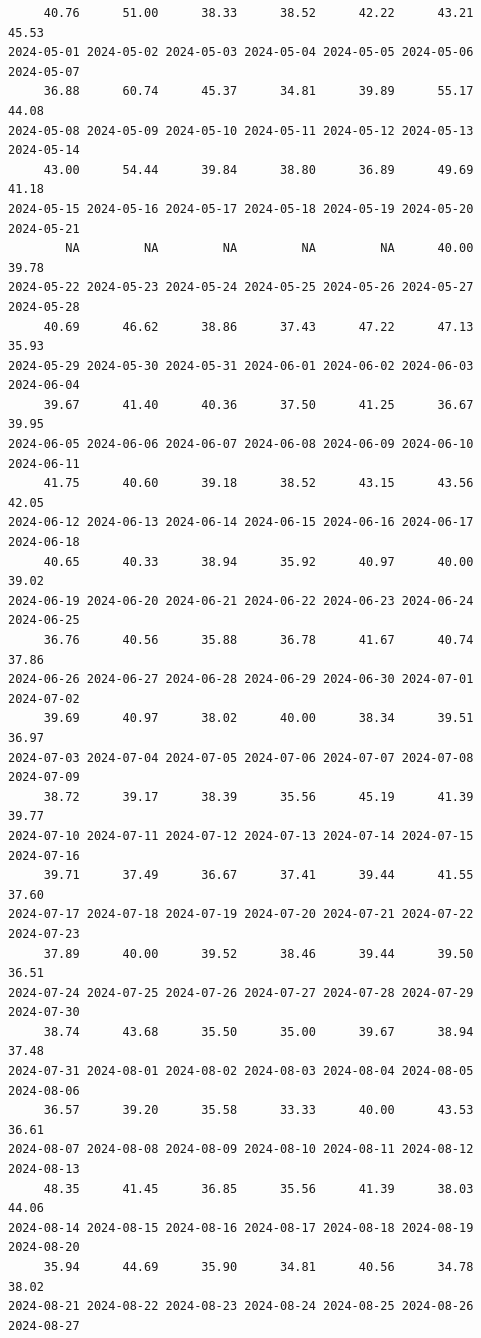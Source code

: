\documentclass[
  letterpaper,
  DIV=11,
  numbers=noendperiod]{scrartcl}
\begin{document}
\begin{verbatim}
     40.76      51.00      38.33      38.52      42.22      43.21      45.53 
2024-05-01 2024-05-02 2024-05-03 2024-05-04 2024-05-05 2024-05-06 2024-05-07 
     36.88      60.74      45.37      34.81      39.89      55.17      44.08 
2024-05-08 2024-05-09 2024-05-10 2024-05-11 2024-05-12 2024-05-13 2024-05-14 
     43.00      54.44      39.84      38.80      36.89      49.69      41.18 
2024-05-15 2024-05-16 2024-05-17 2024-05-18 2024-05-19 2024-05-20 2024-05-21 
        NA         NA         NA         NA         NA      40.00      39.78 
2024-05-22 2024-05-23 2024-05-24 2024-05-25 2024-05-26 2024-05-27 2024-05-28 
     40.69      46.62      38.86      37.43      47.22      47.13      35.93 
2024-05-29 2024-05-30 2024-05-31 2024-06-01 2024-06-02 2024-06-03 2024-06-04 
     39.67      41.40      40.36      37.50      41.25      36.67      39.95 
2024-06-05 2024-06-06 2024-06-07 2024-06-08 2024-06-09 2024-06-10 2024-06-11 
     41.75      40.60      39.18      38.52      43.15      43.56      42.05 
2024-06-12 2024-06-13 2024-06-14 2024-06-15 2024-06-16 2024-06-17 2024-06-18 
     40.65      40.33      38.94      35.92      40.97      40.00      39.02 
2024-06-19 2024-06-20 2024-06-21 2024-06-22 2024-06-23 2024-06-24 2024-06-25 
     36.76      40.56      35.88      36.78      41.67      40.74      37.86 
2024-06-26 2024-06-27 2024-06-28 2024-06-29 2024-06-30 2024-07-01 2024-07-02 
     39.69      40.97      38.02      40.00      38.34      39.51      36.97 
2024-07-03 2024-07-04 2024-07-05 2024-07-06 2024-07-07 2024-07-08 2024-07-09 
     38.72      39.17      38.39      35.56      45.19      41.39      39.77 
2024-07-10 2024-07-11 2024-07-12 2024-07-13 2024-07-14 2024-07-15 2024-07-16 
     39.71      37.49      36.67      37.41      39.44      41.55      37.60 
2024-07-17 2024-07-18 2024-07-19 2024-07-20 2024-07-21 2024-07-22 2024-07-23 
     37.89      40.00      39.52      38.46      39.44      39.50      36.51 
2024-07-24 2024-07-25 2024-07-26 2024-07-27 2024-07-28 2024-07-29 2024-07-30 
     38.74      43.68      35.50      35.00      39.67      38.94      37.48 
2024-07-31 2024-08-01 2024-08-02 2024-08-03 2024-08-04 2024-08-05 2024-08-06 
     36.57      39.20      35.58      33.33      40.00      43.53      36.61 
2024-08-07 2024-08-08 2024-08-09 2024-08-10 2024-08-11 2024-08-12 2024-08-13 
     48.35      41.45      36.85      35.56      41.39      38.03      44.06 
2024-08-14 2024-08-15 2024-08-16 2024-08-17 2024-08-18 2024-08-19 2024-08-20 
     35.94      44.69      35.90      34.81      40.56      34.78      38.02 
2024-08-21 2024-08-22 2024-08-23 2024-08-24 2024-08-25 2024-08-26 2024-08-27 

\end{verbatim}
\end{document}
